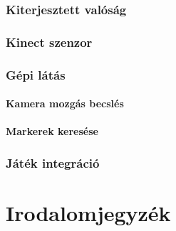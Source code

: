 \documentclass[12pt,a4paper,oneside]{report} %
\begin{document}
\subsection{Kiterjesztett valóság}
\subsection{Kinect szenzor}
\subsection{Gépi látás}
\subsubsection{Kamera mozgás becslés}
\subsubsection{Markerek keresése}
\subsection{Játék integráció}


\newpage
\chapter*{Irodalomjegyzék}
\printbibliography[heading=none]
\newpage
\listoffigures
{}
\end{document}
